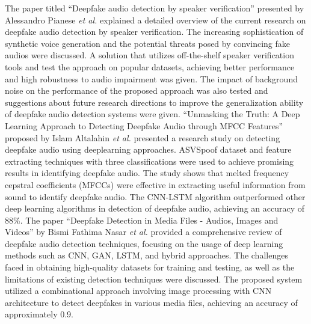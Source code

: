 \newline
The paper titled “Deepfake audio detection by speaker verification” \cite{b7} presented by Alessandro Pianese \textit{et al.} explained a detailed overview of the current research on deepfake audio detection by speaker verification. The increasing sophistication of synthetic voice generation and the potential threats posed by convincing fake audios were discussed. A solution that utilizes off-the-shelf speaker verification tools and test the approach on popular datasets, achieving better performance and high robustness to audio impairment was given. The impact of background noise on the performance of the proposed approach was also tested and suggestions about future research directions to improve the generalization ability of deepfake audio detection systems were given. \newline
\newline
“Unmasking the Truth: A Deep Learning Approach to Detecting Deepfake Audio through MFCC Features” \cite{b8} proposed by Islam Altalahin \textit{et al.} presented a research study on detecting deepfake audio using deeplearning approaches. ASVSpoof dataset and feature extracting techniques with three classifications were used to achieve promising results in identifying deepfake audio. The study shows that melted frequency cepstral coefficients (MFCCs) were effective in extracting useful information from sound to identify deepfake audio. The CNN-LSTM algorithm outperformed other deep learning algorithms in detection of deepfake audio, achieving an accuracy of 88\%.\newline
\newline
The paper “Deepfake Detection in Media Files - Audios, Images and Videos” \cite{b9} by Bismi Fathima Nasar \textit{et al.} provided a comprehensive review of deepfake audio detection techniques, focusing on the usage of deep learning methods such as CNN, GAN, LSTM, and hybrid approaches. The challenges faced in obtaining high-quality datasets for training and testing, as well as the limitations of existing detection techniques were discussed. The proposed system utilized a combinational approach involving image processing with CNN architecture to detect deepfakes in various media files, achieving an accuracy of approximately 0.9.\newline
\newline

